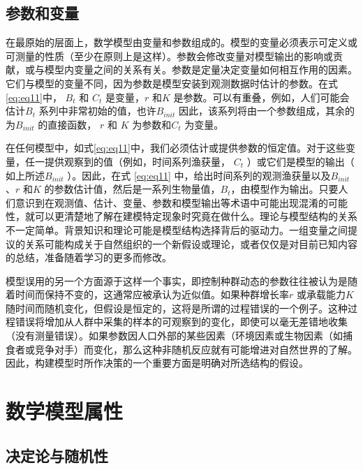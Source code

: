 \documentclass[
  lang=cn,
  11pt,
  scheme=chinese,
  chinesefont=nofont,
  citestyle=gb7714-2015,
  bibstyle=gb7714-2015]{elegantbook}
\begin{document}
\subsection{参数和变量}\label{ux53c2ux6570ux548cux53d8ux91cf}

在最原始的层面上，数学模型由变量和参数组成的。模型的变量必须表示可定义或可测量的性质（至少在原则上是这样）。参数会修改变量对模型输出的影响或贡献，或与模型内变量之间的关系有关。参数是定量决定变量如何相互作用的因素。它们与模型的变量不同，因为参数是模型安装到观测数据时估计的参数。在式 \eqref{eq:eq11}中， \(B_t\) 和 \(C_t\) 是变量，\(r\) 和\(K\) 是参数。可以有重叠，例如，人们可能会估计\(B_t\) 系列中非常初始的值，也许\(B_{init}\) 因此，该系列将由一个参数组成，其余的为\(B_{init}\) 的直接函数， \(r\) 和 \(K\) 为参数和\(C_t\) 为变量。

在任何模型中，如式\eqref{eq:eq11}中，我们必须估计或提供参数的恒定值。对于这些变量，任一提供观察到的值（例如，时间系列渔获量， \(C_t\) ）或它们是模型的输出（ 如上所述\(B_{init}\) ）。因此，在式 \eqref{eq:eq11} 中，给出时间系列的观测渔获量以及\(B_{init}\) 、\(r\) 和\(K\) 的参数估计值，然后是一系列生物量值，\(B_t\)，由模型作为输出。只要人们意识到在观测值、估计、变量、参数和模型输出等术语中可能出现混淆的可能性，就可以更清楚地了解在建模特定现象时究竟在做什么。理论与模型结构的关系不一定简单。背景知识和理论可能是模型结构选择背后的驱动力。一组变量之间提议的关系可能构成关于自然组织的一个新假设或理论，或者仅仅是对目前已知内容的总结，准备随着学习的更多而修改。

模型误用的另一个方面源于这样一个事实，即控制种群动态的参数往往被认为是随着时间而保持不变的，这通常应被承认为近似值。如果种群增长率\(r\) 或承载能力\(K\) 随时间而随机变化，但假设是恒定的，这将是所谓的过程错误的一个例子。这种过程错误将增加从人群中采集的样本的可观察到的变化，即使可以毫无差错地收集（没有测量错误）。如果参数因人口外部的某些因素（环境因素或生物因素（如捕食者或竞争对手）而变化，那么这种非随机反应就有可能增进对自然世界的了解。因此，构建模型时所作决策的一个重要方面是明确对所选结构的假设。

\section{数学模型属性}\label{ux6570ux5b66ux6a21ux578bux5c5eux6027}

\subsection{决定论与随机性}\label{ux51b3ux5b9aux8bbaux4e0eux968fux673aux6027}
\end{document}
